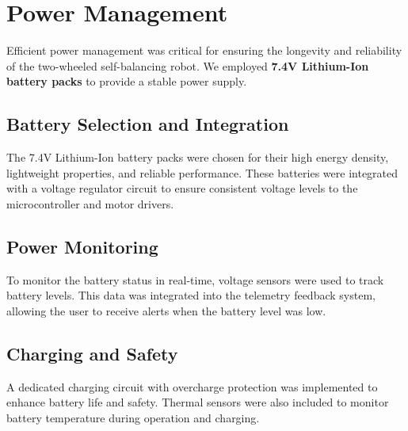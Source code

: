 \section{Power Management}

Efficient power management was critical for ensuring the longevity and reliability of the two-wheeled self-balancing robot. We employed \textbf{7.4V Lithium-Ion battery packs} to provide a stable power supply.

\subsection{Battery Selection and Integration}
The 7.4V Lithium-Ion battery packs were chosen for their high energy density, lightweight properties, and reliable performance. These batteries were integrated with a voltage regulator circuit to ensure consistent voltage levels to the microcontroller and motor drivers.

\subsection{Power Monitoring}
To monitor the battery status in real-time, voltage sensors were used to track battery levels. This data was integrated into the telemetry feedback system, allowing the user to receive alerts when the battery level was low.

\subsection{Charging and Safety}
A dedicated charging circuit with overcharge protection was implemented to enhance battery life and safety. Thermal sensors were also included to monitor battery temperature during operation and charging.